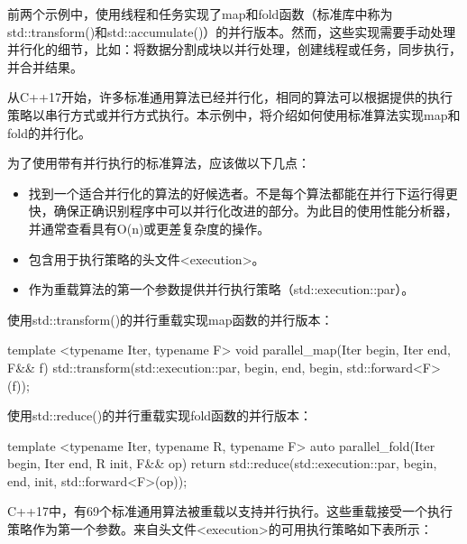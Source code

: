 前两个示例中，使用线程和任务实现了map和fold函数（标准库中称为std::transform()和std::accumulate()）的并行版本。然而，这些实现需要手动处理并行化的细节，比如：将数据分割成块以并行处理，创建线程或任务，同步执行，并合并结果。

从C++17开始，许多标准通用算法已经并行化，相同的算法可以根据提供的执行策略以串行方式或并行方式执行。本示例中，将介绍如何使用标准算法实现map和fold的并行化。



为了使用带有并行执行的标准算法，应该做以下几点：

\begin{itemize}
\item
找到一个适合并行化的算法的好候选者。不是每个算法都能在并行下运行得更快，确保正确识别程序中可以并行化改进的部分。为此目的使用性能分析器，并通常查看具有O(n)或更差复杂度的操作。

\item
包含用于执行策略的头文件<execution>。

\item
作为重载算法的第一个参数提供并行执行策略（std::execution::par）。
\end{itemize}

使用std::transform()的并行重载实现map函数的并行版本：

\begin{cpp}
template <typename Iter, typename F>
void parallel_map(Iter begin, Iter end, F&& f)
{
    std::transform(std::execution::par,
                   begin, end,
                   begin,
                   std::forward<F>(f));
}
\end{cpp}

使用std::reduce()的并行重载实现fold函数的并行版本：

\begin{cpp}
template <typename Iter, typename R, typename F>
auto parallel_fold(Iter begin, Iter end, R init, F&& op)
{
    return std::reduce(std::execution::par,
                       begin, end,
                       init,
                       std::forward<F>(op));
}
\end{cpp}


C++17中，有69个标准通用算法被重载以支持并行执行。这些重载接受一个执行策略作为第一个参数。来自头文件<execution>的可用执行策略如下表所示：

